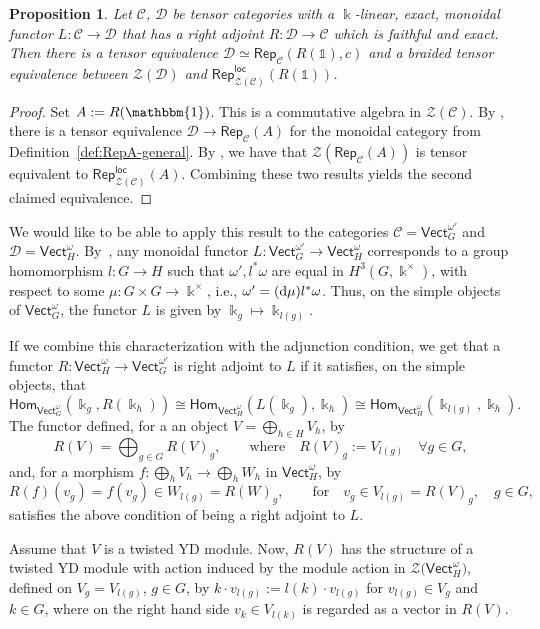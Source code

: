 \documentclass[pdftex]{sigma}
\numberwithin{equation}{section}
\newtheorem{Proposition}[Theorem]{Proposition}
 { \theoremstyle{definition}
\newtheorem{Definition}[Theorem]{Definition}
\newtheorem{Note}[Theorem]{Note}
\newtheorem{Notation}[Theorem]{Notation}
\newtheorem{Example}[Theorem]{Example}
\newtheorem{Remark}[Theorem]{Remark} }
\newcommand{\deri}{{\rm d}}
\newcommand{\Hom}{\mathsf{Hom}}
\newcommand{\one}{\mathds{1}}
\newcommand{\Rep}{\mathsf{Rep}}
\newcommand{\locmod}{\mathsf{Rep}^{\mathsf{loc}}}
\newcommand{\Vect}{\mathsf{Vect}}
\newcommand{\cC}{\mathcal{C}}
\newcommand{\cD}{\mathcal{D}}
\newcommand{\cZ}{\mathcal{Z}}
\begin{document}
\begin{Proposition}\label{prop:BN}
Let $\cC$, $\cD$ be tensor categories with a $\Bbbk$-linear, exact, monoidal functor $L \colon \cC \to \cD$ that has a right adjoint $R\colon \cD\to \cC$ which is faithful and exact. Then there is a tensor equivalence $\cD\simeq \Rep_\cC(R(\one),c)$ and a braided tensor equivalence between $\cZ(\cD)$ and $\locmod_{\cZ(\cC)}(R(\one))$.
\end{Proposition}
\begin{proof}
Set $A := R(\mathbbm{1})$. This is a commutative algebra in $\cZ(\cC)$.
By \cite[Proposition 6.1]{BN11}, there is a tensor equivalence $\cD \to \Rep_{\cC}(A)$ for the monoidal category from Definition~\ref{def:RepA-general}. By \cite[Corollary~4.5]{Sch}, we have that
$\cZ(\Rep_{\cC}(A))$ is tensor equivalent to $\locmod_{\cZ(\cC)}(A)$. Combining these two results yields the second claimed equivalence.
\end{proof}

We would like to be able to apply this result to the categories $\cC = \Vect_G^{\omega'}$ and $\cD = \Vect_H^\omega$. By~\cite[Section 2.6]{EGNO}, any monoidal functor $L\colon \Vect_G^{\omega'}\to \Vect_H^\omega$ corresponds to a group homomorphism $l\colon G\to H$ such that $\omega', l^*\omega$ are equal in $H^3(G,\Bbbk^\times)$, with respect to some $\mu\colon G\times G\to \Bbbk^\times$, i.e., $\omega'=(\deri \mu) l^*\omega$. Thus, on the simple objects of $\Vect_G^\omega$, the functor $L$ is given by $\Bbbk_g \mapsto \Bbbk_{l(g)}$.


If we combine this characterization with the adjunction condition, we get that a functor $R \colon \Vect_H^\omega \to \Vect_G^{\omega'}$ is right adjoint to $L$ if it satisfies, on the simple objects, that
\begin{equation*}
 \Hom_{\Vect_G^\omega}(\Bbbk_g,R(\Bbbk_h)) \cong \Hom_{\Vect_H^\omega}(L(\Bbbk_g),\Bbbk_h) \cong \Hom_{\Vect_H^\omega}(\Bbbk_{l(g)},\Bbbk_h).
\end{equation*}
The functor defined, for a an object $V=\bigoplus_{h\in H}V_h$, by
\[R(V)=\bigoplus_{g\in G}R(V)_{g}, \qquad \text{where}\quad R(V)_g := V_{l(g)} \quad \forall g\in G,
\] and, for a morphism $f\colon \bigoplus_h V_h\to \bigoplus_{h}W_h$ in $\Vect_H^\omega$, by
\[R(f)(v_g)= f(v_g)\in W_{l(g)}=R(W)_g, \qquad \text{for}\quad v_g\in V_{l(g)}=R(V)_g,\quad g\in G,\]
satisfies the above condition of being a right adjoint to $L$.

Assume that $V$ is a twisted YD module.
Now, $R(V)$ has the structure of a twisted YD module with action induced by the module action in $\cZ\big(\Vect_H^\omega\big)$, defined on $V_g=V_{l(g)}$, $g\in G$, by $k\cdot v_{l(g)} := l(k)\cdot v_{l(g)}$ for $v_{l(g)}\in V_g$ and $k\in G$, where on the right hand side $v_k\in V_{l(k)}$ is regarded as a vector in $R(V)$.
\end{document}
